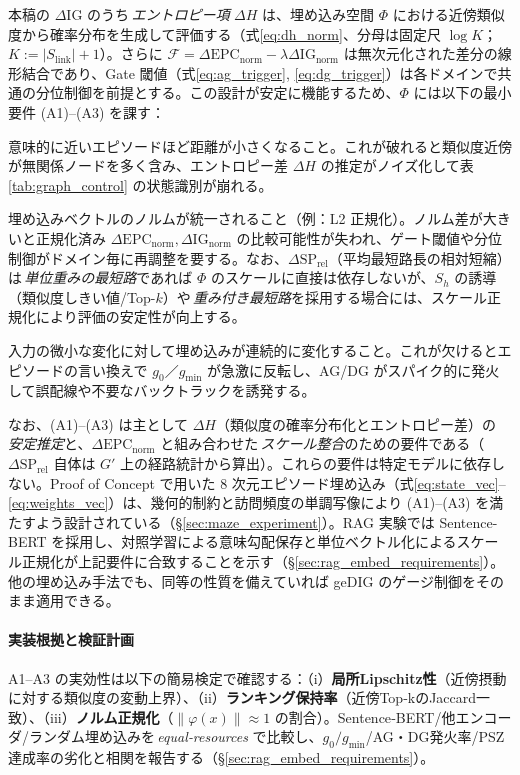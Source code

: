 \documentclass[ja=standard,xelatex]{bxjsarticle}
\newcommand{\F}{\mathcal{F}}
\newcommand{\gednorm}{\Delta\mathrm{EPC}_{\mathrm{norm}}}
\newcommand{\ignorm}{\Delta\mathrm{IG}_{\mathrm{norm}}}
\begin{document}
本稿の $\Delta\mathrm{IG}$ のうち\,\emph{エントロピー項} $\Delta H$ は、埋め込み空間 $\Phi$ における近傍類似度から確率分布を生成して評価する（式\eqref{eq:dh_norm}、分母は固定尺 $\log K$；$K:=|S_{\mathrm{link}}|{+}1$）。さらに $\F=\gednorm-\lambda\ignorm$ は無次元化された差分の線形結合であり、Gate 閾値（式\eqref{eq:ag_trigger}, \eqref{eq:dg_trigger}）は各ドメインで共通の分位制御を前提とする。この設計が安定に機能するため、$\Phi$ には以下の最小要件 (A1)--(A3) を課す：
\begin{description}[leftmargin=1.8em,labelwidth=3.5em]
  \item[(A1) 意味勾配保存] 意味的に近いエピソードほど距離が小さくなること。これが破れると類似度近傍が無関係ノードを多く含み、エントロピー差 $\Delta H$ の推定がノイズ化して表\ref{tab:graph_control} の状態識別が崩れる。
  \item[(A2) スケール正規化] 埋め込みベクトルのノルムが統一されること（例：L2 正規化）。ノルム差が大きいと正規化済み $\gednorm, \ignorm$ の比較可能性が失われ、ゲート閾値や分位制御がドメイン毎に再調整を要する。なお、$\Delta\mathrm{SP}_{\mathrm{rel}}$（平均最短路長の相対短縮）は\,\emph{単位重みの最短路}であれば $\Phi$ のスケールに直接は依存しないが、$S_h$ の誘導（類似度しきい値/Top-$k$）や\,\emph{重み付き最短路}を採用する場合には、スケール正規化により評価の安定性が向上する。
  \item[(A3) 局所滑らかさ] 入力の微小な変化に対して埋め込みが連続的に変化すること。これが欠けるとエピソードの言い換えで $g_0$／$g_{\min}$ が急激に反転し、AG/DG がスパイク的に発火して誤配線や不要なバックトラックを誘発する。
\end{description}

なお、(A1)--(A3) は主として $\Delta H$（類似度の確率分布化とエントロピー差）の\,\emph{安定推定}と、$\gednorm$ と組み合わせた\,\emph{スケール整合}のための要件である（$\Delta\mathrm{SP}_{\mathrm{rel}}$ 自体は $G'$ 上の経路統計から算出）。これらの要件は特定モデルに依存しない。Proof of Concept で用いた 8 次元エピソード埋め込み（式\eqref{eq:state_vec}--\eqref{eq:weights_vec}）は、幾何的制約と訪問頻度の単調写像により (A1)--(A3) を満たすよう設計されている（\S\ref{sec:maze_experiment}）。RAG 実験では Sentence-BERT \cite{Reimers2019} を採用し、対照学習による意味勾配保存と単位ベクトル化によるスケール正規化が上記要件に合致することを示す（\S\ref{sec:rag_embed_requirements}）。他の埋め込み手法でも、同等の性質を備えていれば geDIG のゲージ制御をそのまま適用できる。

\paragraph{実装根拠と検証計画} A1–A3 の実効性は以下の簡易検定で確認する：（i）\textbf{局所Lipschitz性}（近傍摂動に対する類似度の変動上界）、（ii）\textbf{ランキング保持率}（近傍Top‑kのJaccard一致）、（iii）\textbf{ノルム正規化}（$\lVert\varphi(x)\rVert\approx1$ の割合）。Sentence‑BERT/他エンコーダ/ランダム埋め込みを\,\emph{equal‑resources} で比較し、$g_0/g_{\min}$/AG・DG発火率/PSZ達成率の劣化と相関を報告する（\S\ref{sec:rag_embed_requirements}）。
\end{document}
